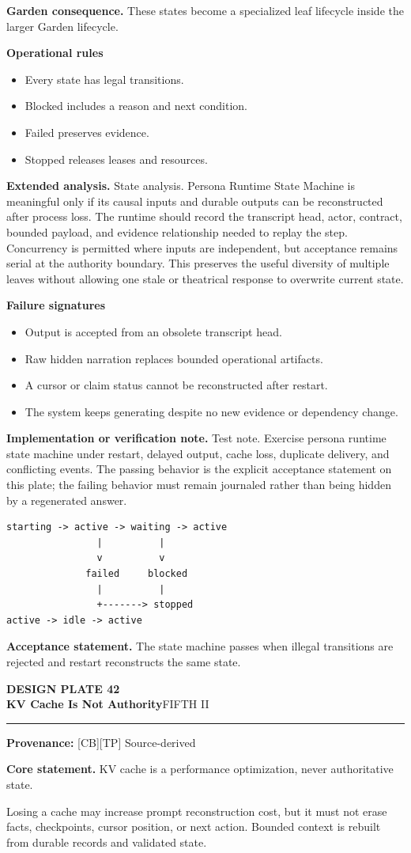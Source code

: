 \documentclass[10pt,letterpaper,oneside]{article}
\newcommand{\prov}[1]{\textcolor{gardenBlue}{\sffamily\footnotesize\textbf{Provenance:} #1}}
\newcommand{\platetitle}[3]{%
  \begin{minipage}[t][0.54in][t]{\textwidth}
  {\sffamily\bfseries\color{gardenDeep}\fontsize{9}{10}\selectfont DESIGN PLATE #1}\\[-1pt]
  {\sffamily\bfseries\color{gardenInk}\fontsize{16.5}{18}\selectfont #2}\hfill{\sffamily\color{gardenGreen}\large #3}
  \end{minipage}\vspace{-2pt}\hrule\vspace{5pt}}
\begin{document}
\textbf{Garden consequence.} These states become a specialized leaf lifecycle inside the larger Garden lifecycle.

\textbf{Operational rules}
\begin{itemize}
\item Every state has legal transitions.
\item Blocked includes a reason and next condition.
\item Failed preserves evidence.
\item Stopped releases leases and resources.
\end{itemize}
\textbf{Extended analysis.} State analysis. Persona Runtime State Machine is meaningful only if its causal inputs and durable outputs can be reconstructed after process loss. The runtime should record the transcript head, actor, contract, bounded payload, and evidence relationship needed to replay the step. Concurrency is permitted where inputs are independent, but acceptance remains serial at the authority boundary. This preserves the useful diversity of multiple leaves without allowing one stale or theatrical response to overwrite current state.

\textbf{Failure signatures}
\begin{itemize}
\item Output is accepted from an obsolete transcript head.
\item Raw hidden narration replaces bounded operational artifacts.
\item A cursor or claim status cannot be reconstructed after restart.
\item The system keeps generating despite no new evidence or dependency change.
\end{itemize}
\textbf{Implementation or verification note.} Test note. Exercise persona runtime state machine under restart, delayed output, cache loss, duplicate delivery, and conflicting events. The passing behavior is the explicit acceptance statement on this plate; the failing behavior must remain journaled rather than being hidden by a regenerated answer.

\begin{lstlisting}
starting -> active -> waiting -> active
                |          |
                v          v
              failed     blocked
                |          |
                +-------> stopped
active -> idle -> active
\end{lstlisting}
\begin{acceptbox}
\textbf{Acceptance statement.} The state machine passes when illegal transitions are rejected and restart reconstructs the same state.
\end{acceptbox}
\newpage
\platetitle{42}{KV Cache Is Not Authority}{FIFTH II}
\prov{[CB][TP] Source-derived}
\fontsize{8.85}{10.45}\selectfont
\begin{corebox}
\textbf{Core statement.} KV cache is a performance optimization, never authoritative state.
\end{corebox}
Losing a cache may increase prompt reconstruction cost, but it must not erase facts, checkpoints, cursor position, or next action. Bounded context is rebuilt from durable records and validated state.
\end{document}
